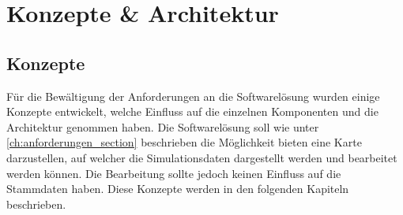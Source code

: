 \chapter{Konzepte \& Architektur}
\section{Konzepte}
Für die Bewältigung der Anforderungen an die Softwarelösung wurden einige Konzepte entwickelt, welche Einfluss auf die einzelnen Komponenten und die Architektur genommen haben. Die Softwarelösung soll wie unter \ref{ch:anforderungen_section}  beschrieben die Möglichkeit bieten eine Karte darzustellen, auf welcher die Simulationsdaten dargestellt werden und bearbeitet werden können. Die Bearbeitung sollte jedoch keinen Einfluss auf die Stammdaten haben. Diese Konzepte werden in den folgenden Kapiteln beschrieben.
